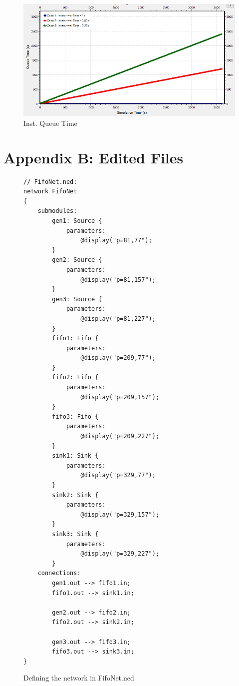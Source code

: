 \documentclass{article}
\begin{document}
\begin{figure}[h!]
	\begin{center}
	\includegraphics[scale=0.65]{Images/QTime.PNG}
	\vspace{-.25cm}
	\caption{Inst. Queue Time}
	\label{fig:qtime}
	\end{center}
\end{figure}

\section*{Appendix B:  Edited Files}

\begin{figure}[H]
\label{FifoNet}
\begin{lstlisting}
// FifoNet.ned:
network FifoNet
{
    submodules:
        gen1: Source {
            parameters:
                @display("p=81,77");
        }
        gen2: Source {
            parameters:
                @display("p=81,157");
        }
        gen3: Source {
            parameters:
                @display("p=81,227");
        }
        fifo1: Fifo {
            parameters:
                @display("p=209,77");
        }
        fifo2: Fifo {
            parameters:
                @display("p=209,157");
        }
        fifo3: Fifo {
            parameters:
                @display("p=209,227");
        }
        sink1: Sink {
            parameters:
                @display("p=329,77");
        }
        sink2: Sink {
            parameters:
                @display("p=329,157");
        }
        sink3: Sink {
            parameters:
                @display("p=329,227");
        }
    connections:
        gen1.out --> fifo1.in;
        fifo1.out --> sink1.in;

        gen2.out --> fifo2.in;
        fifo2.out --> sink2.in;

        gen3.out --> fifo3.in;
        fifo3.out --> sink3.in;
}
\end{lstlisting}
\vspace{-1cm}
\caption*{Defining the network in FifoNet.ned}
\end{figure}
\end{document}
